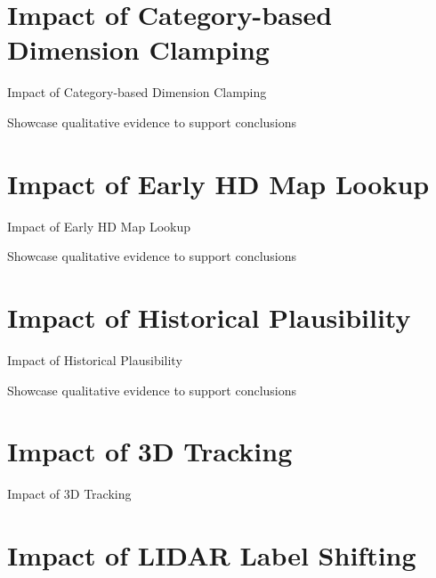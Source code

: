 
\section{Impact of Category-based Dimension Clamping}
\label{sec:impactsizefiltering}

Impact of Category-based Dimension Clamping

Showcase qualitative evidence to support conclusions

\newpage


\section{Impact of Early HD Map Lookup}
\label{sec:impactearlymap}

Impact of Early HD Map Lookup

Showcase qualitative evidence to support conclusions

\newpage


\section{Impact of Historical Plausibility}
\label{sec:impacthistplausibility}

Impact of Historical Plausibility

Showcase qualitative evidence to support conclusions

\newpage


\section{Impact of 3D Tracking}
\label{sec:impacttracking}

Impact of 3D Tracking

\newpage


\section{Impact of LIDAR Label Shifting}
\label{sec:impactlabelshifting}

